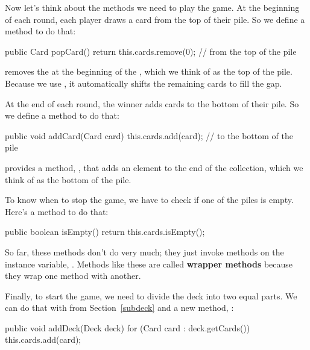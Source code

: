
Now let's think about the methods we need to play the game.
At the beginning of each round, each player draws a card from the top of their pile.
So we define a method to do that:


\begin{code}
public Card popCard() {
    return this.cards.remove(0);  // from the top of the pile
}
\end{code}

 removes the  at the beginning of the , which we think of as the top of the pile.
Because we use , it automatically shifts the remaining cards to fill the gap.

At the end of each round, the winner adds cards to the bottom of their pile.
So we define a method to do that:

\begin{code}
public void addCard(Card card) {
    this.cards.add(card);        // to the bottom of the pile
}
\end{code}

 provides a method, , that adds an element to the end of the collection, which we think of as the bottom of the pile.

To know when to stop the game, we have to check if one of the piles is empty.
Here's a method to do that:

\begin{code}
public boolean isEmpty() {
    return this.cards.isEmpty();
}
\end{code}

So far, these methods don't do very much; they just invoke methods on the instance variable, .
Methods like these are called {\bf wrapper methods} because they wrap one method with another.

Finally, to start the game, we need to divide the deck into two equal parts.
We can do that with  from Section~\ref{subdeck} and a new method, :

\begin{code}
public void addDeck(Deck deck) {
    for (Card card : deck.getCards()) {
        this.cards.add(card);
    }
}
\end{code}

